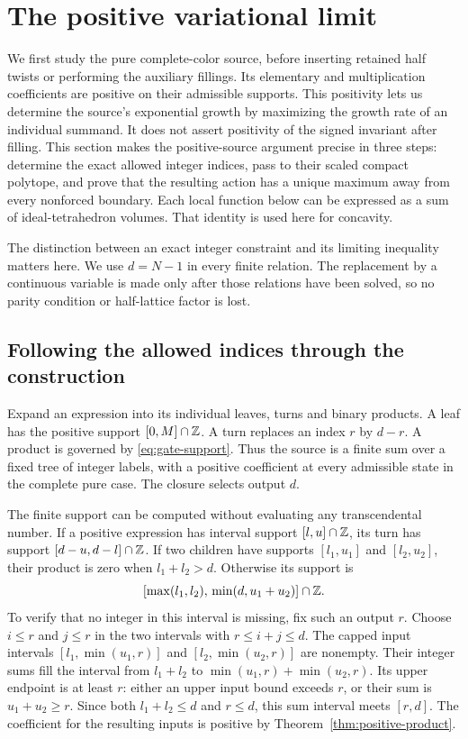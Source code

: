 \documentclass[11pt]{article}
\numberwithin{equation}{section}
\theoremstyle{definition}\newtheorem{definition}[theorem]{Definition}
\theoremstyle{remark}\newtheorem{remark}[theorem]{Remark}
\begin{document}
\section{The positive variational limit}\label{nt:variational}
We first study the pure complete-color source, before inserting retained half twists or performing the auxiliary fillings. Its elementary and multiplication coefficients are positive on their admissible supports. This positivity lets us determine the source's exponential growth by maximizing the growth rate of an individual summand. It does not assert positivity of the signed invariant after filling. This section makes the positive-source argument precise in three steps: determine the exact allowed integer indices, pass to their scaled compact polytope, and prove that the resulting action has a unique maximum away from every nonforced boundary. Each local function below can be expressed as a sum of ideal-tetrahedron volumes. That identity is used here for concavity.

The distinction between an exact integer constraint and its limiting inequality matters here. We use $d=N-1$ in every finite relation. The replacement by a continuous variable is made only after those relations have been solved, so no parity condition or half-lattice factor is lost.

\subsection{Following the allowed indices through the construction}
Expand an expression into its individual leaves, turns and binary products. A leaf has the positive support $[0,M]\cap\mathbb Z$. A turn replaces an index $r$ by $d-r$. A product is governed by \eqref{eq:gate-support}. Thus the source is a finite sum over a fixed tree of integer labels, with a positive coefficient at every admissible state in the complete pure case. The closure selects output $d$.

The finite support can be computed without evaluating any transcendental number. If a positive expression has interval support $[l,u]\cap\mathbb Z$, its turn has support $[d-u,d-l]\cap\mathbb Z$. If two children have supports $[l_1,u_1]$ and $[l_2,u_2]$, their product is zero when $l_1+l_2>d$. Otherwise its support is
\begin{equation}\label{eq:interval-compiler}
 [\max(l_1,l_2),\,\min(d,u_1+u_2)]\cap\mathbb Z.
\end{equation}
To verify that no integer in this interval is missing, fix such an output $r$. Choose $i\le r$ and $j\le r$ in the two intervals with $r\le i+j\le d$. The capped input intervals $[l_1,\min(u_1,r)]$ and
$[l_2,\min(u_2,r)]$ are nonempty. Their integer sums fill the interval
from $l_1+l_2$ to $\min(u_1,r)+\min(u_2,r)$. Its upper endpoint is
at least $r$: either an upper input bound exceeds $r$, or their sum
is $u_1+u_2\ge r$. Since both $l_1+l_2\le d$ and $r\le d$,
this sum interval meets $[r,d]$. The coefficient for the resulting
inputs is positive by Theorem~\ref{thm:positive-product}.
\end{document}
